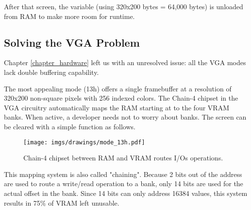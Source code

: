 \documentclass[book.tex]{subfiles}
\begin{document}
\begin{minipage}{\textwidth}

\end{minipage}
After that screen, the  variable (using 320x200 bytes = 64,000 bytes) is unloaded from RAM to make more room for runtime.\\
\par
{}
\pagebreak




















\subsection{Solving the VGA Problem}
Chapter \ref{chapter_hardware}  left us with an unresolved issue: all the VGA modes lack double buffering capability.\\
\par
 The most appealing mode (13h) offers a single framebuffer at a resolution of 320x200 non-square pixels with 256 indexed colors. The Chain-4 chipset in the VGA circuitry automatically maps the RAM starting at  to the four VRAM banks. When active, a developer needs not to worry about banks. The screen can be cleared with a simple function as follows.\\
 \par
   \begin{minipage}{\textwidth}
  
  \end{minipage}
 \par
 \begin{figure}[H]
\centering
      \texttt{[image: imgs/drawings/mode\_13h.pdf]}
      \caption{Chain-4 chipset between RAM and VRAM routes I/Os operations.}
\end{figure}

This mapping system is also called "chaining". Because 2 bits out of the address are used to route a write/read operation to a bank, only 14 bits are used for the actual offset in the bank. Since 14 bits can only address 16384 values, this system results in 75\% of VRAM left unusable.\\
\end{document}
